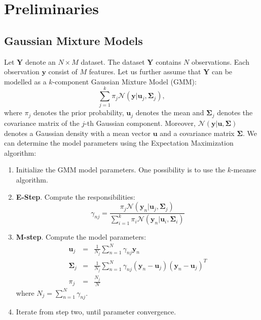 \documentclass{article}
\begin{document}
\section{Preliminaries}

\subsection{Gaussian Mixture Models}
Let $\mathbf{Y}$ denote an $N\times M$ dataset. The dataset $\mathbf{Y}$ contains $N$ observations. Each observation $\mathbf{y}$ consist of $M$ features. Let us further assume 
that $\mathbf{Y}$ can be modelled as a $k$-component Gaussian Mixture Model (GMM):
\begin{equation}
\sum_{j=1}^k \pi_j \mathcal{N}(\mathbf{y}|\mathbf{u}_j,\mathbf{\Sigma}_j),
\end{equation}
where $\pi_j$ denotes the prior probability, $\mathbf{u}_j$ denotes the mean and $\mathbf{\Sigma}_j$ denotes the covariance matrix of the $j$-th Gaussian component. Moreover,
$\mathcal{N}(\mathbf{y}|\mathbf{u},\mathbf{\Sigma})$ denotes a Gaussian density with a mean vector $\mathbf{u}$ and a covariance matrix $\mathbf{\Sigma}$.  
We can determine the model parameters using the Expectation Maximization algorithm:
\begin{enumerate}
 \item Initialize the GMM model parameters. One possibility is to use the $k$-meanse algorithm.
 \item \textbf{E-Step}. Compute the responsibilities:
 \begin{equation}
  \gamma_{nj} = \frac{\pi_j\mathcal{N}(\mathbf{y}_n|\mathbf{u}_j,\mathbf{\Sigma}_j)}{\sum_{i=1}^{k}\pi_i\mathcal{N}(\mathbf{y}_n|\mathbf{u}_i,\mathbf{\Sigma}_i)}
 \end{equation}
 \item \textbf{M-step}. Compute the model parameters:
 \begin{eqnarray}
  \mathbf{u}_j &=& \frac{1}{N_j} \sum_{n=1}^{N} \gamma_{nj}\mathbf{y}_n\\
  \mathbf{\Sigma}_j &=& \frac{1}{N_j} \sum_{n=1}^{N} \gamma_{nj} (\mathbf{y}_n-\mathbf{u}_j)(\mathbf{y}_n-\mathbf{u}_j)^T\\
  \pi_j &=& \frac{N_j}{N}
 \end{eqnarray}
 where $N_j = \sum_{n=1}^N \gamma_{nj}$.
 \item Iterate from step two, until parameter convergence.
\end{enumerate}
\end{document}
